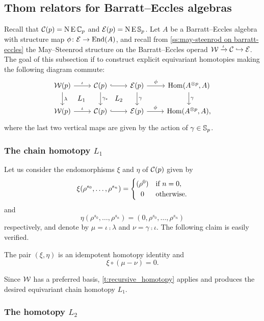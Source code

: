\subsection{Thom relators for Barratt--Eccles algebras}

Recall that $\mathcal{C}(p) = \operatorname{N} \operatorname{E} \mathbb{C}_p$ and $\mathcal{E}(p) = \operatorname{N} \operatorname{E} \mathbb{S}_p$.
Let $A$ be a Barratt--Eccles algebra with structure map $\phi \colon \mathcal{E} \to \mathrm{End}(A)$, and recall from \cref{ss:may-steenrod on barratt-eccles} the May--Steenrod structure on the Barratt--Eccles operad $\mathcal{W} \xrightarrow{\iota} \mathcal{C} \hookrightarrow \mathcal{E}$.
The goal of this subsection if to construct explicit equivariant homotopies making the following diagram commute:
\[
\begin{tikzcd}
	\cW(p) \arrow[r, "\iota"] \arrow[d,"\lambda"] \arrow[dr,phantom,"L_1"] &
	\cC(p) \arrow[r, hook] \arrow[d, "\gamma_\ast"] \arrow[dr,phantom,"L_2"] &
	\BE(p) \arrow[r,"\phi"] \arrow[d,"\gamma"] &
	\Hom(A^{\ot p}, A) \arrow[d,"\gamma"] \\
	\cW(p) \arrow[r, "\iota"] &
	\cC(p) \arrow[r, hook] &
	\BE(p) \arrow[r,"\phi"] &
	\Hom(A^{\ot p}, A),
\end{tikzcd}
\]
where the last two vertical maps are given by the action of $\gamma \in \mathbb{S}_p$.

\subsubsection{The chain homotopy $L_1$}

Let us consider the endomorphisms $\xi$ and $\eta$ of $\mathcal{C}(p)$ given by
\[
\xi(\rho^{s_0},\dots,\rho^{s_n}) =
\begin{cases}
	(\rho^0) & \text{if } n = 0, \\
	\hfil0 & \text{otherwise}.
\end{cases}
\]
and
\[
\eta(\rho^{s_0},\dots,\rho^{s_n}) = (0,\rho^{s_0},\dots,\rho^{s_n})
\]
respectively, and denote by $\mu = \iota \comp \lambda$ and $\nu = \gamma \comp \iota$.
The following claim is easily verified.

\begin{lemma*}
	The pair $(\xi,\eta)$ is an idempotent homotopy identity and
	\[
	\xi \circ (\mu - \nu) = 0.
	\]
\end{lemma*}
Since $\mathcal{W}$ has a preferred basis, \cref{t:recursive_homotopy} applies and produces the desired equivariant chain homotopy $L_1$.

\subsubsection{The homotopy $L_2$}

